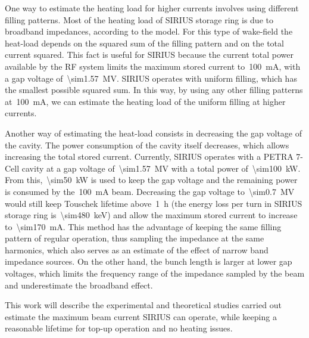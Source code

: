 \documentclass
[
    a4paper,
    biblatex,     %
]{jacow}
\begin{document}
    One way to estimate the heating load for higher currents involves using different filling patterns. Most of the heating load of SIRIUS storage ring is due to broadband impedances, according to the model. For this type of wake-field the heat-load depends on the squared sum of the filling pattern and on the total current squared. This fact is useful for SIRIUS because the current total power available by the RF system limits the maximum stored current to~\SI{100}{\milli\ampere}, with a gap voltage of~\SI{\sim1.57}{\mega\volt}. SIRIUS operates with uniform filling, which has the smallest possible squared sum. In this way, by using any other filling patterns at~\SI{100}{\milli\ampere}, we can estimate the heating load of the uniform filling at higher currents.

    Another way of estimating the heat-load consists in decreasing the gap voltage of the cavity. The power consumption of the cavity itself decreases, which allows increasing the total stored current. Currently, SIRIUS operates with a PETRA 7-Cell cavity at a gap voltage of~\SI{\sim1.57}{\mega\volt} with a total power of~\SI{\sim100}{\kilo\watt}. From this,~\SI{\sim50}{\kilo\watt} is used to keep the gap voltage and the remaining power is consumed by the~\SI{100}{\milli\ampere} beam. Decreasing the gap voltage to~\SI{\sim0.7}{\mega\volt} would still keep Touschek lifetime above~\SI{1}{\hour} (the energy loss per turn in SIRIUS storage ring is~\SI{\sim480}{\kilo\electronvolt}) and allow the maximum stored current to increase to~\SI{\sim170}{\milli\ampere}. This method has the advantage of keeping the same filling pattern of regular operation, thus sampling the impedance at the same harmonics, which also serves as an estimate of the effect of narrow band impedance sources. On the other hand, the bunch length is larger at lower gap voltages, which limits the frequency range of the impedance sampled by the beam and underestimate the broadband effect. 

    This work will describe the experimental and theoretical studies carried out estimate the maximum beam current SIRIUS can operate, while keeping a reasonable lifetime for top-up operation and no heating issues.
\end{document}
